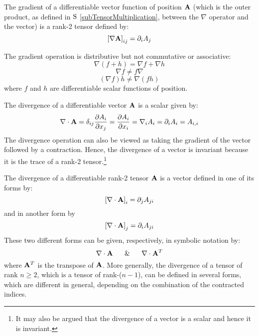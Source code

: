  The gradient of a differentiable vector function of position
$\vector{A}$ (which is the outer product, as defined in $\S$ 
\ref{subTensorMultiplication},
between the $\nabla$ operator and the vector) is a rank-2 tensor
defined by:
\begin{equation}
\left[\nabla\vector{A}\right]_{ij}=\partial_{i}A_{j}\label{eqGrad2}
\end{equation}


 The gradient operation is distributive but not commutative
or associative:
\begin{equation}
\nabla\left(f+h\right)=\nabla f+\nabla h
\end{equation}
\begin{equation}
\nabla f\ne f\nabla
\end{equation}
\begin{equation}
\left(\nabla f\right)h\ne\nabla\left(fh\right)
\end{equation}
where $f$ and $h$ are differentiable scalar functions of position.

 The divergence of a differentiable vector $\vector{A}$
is a scalar given by:
\begin{equation}
\nabla\cdot\vector{A}=\delta_{ij}\dfrac{\partial A_{i}}{\partial 
x_{j}}=\dfrac{\partial A_{i}}{\partial 
x_{i}}=\nabla_{i}A_{i}=\partial_{i}A_{i}=A_{i,i}\label{eqDiv}
\end{equation}
The divergence operation can also be viewed as taking the gradient
of the vector followed by a contraction. Hence, the divergence of
a vector is invariant because it is the trace of a rank-2 tensor.\footnote{It 
may also be argued that the divergence of a vector is a scalar
and hence it is invariant.}

 The divergence of a differentiable rank-2 tensor $\vector{A}$
is a vector defined in one of its forms by:
\begin{equation}
\left[\nabla\cdot\vector{A}\right]_{i}=\partial_{j}A_{ji}\label{eqDiv2}
\end{equation}
and in another form by
\begin{equation}
\left[\nabla\cdot\vector{A}\right]_{j}=\partial_{i}A_{ji}\label{eqDiv3}
\end{equation}
These two different forms can be given, respectively, in symbolic
notation by:
\begin{equation}
\nabla\cdot\vector{A}\,\,\,\,\,\,\,\,\,\,\&\,\,\,\,\,\,\,\,\,\,
\nabla\cdot\vector{A}^{T}
\end{equation}
where $\vector{A}^{T}$ is the transpose of $\vector{A}$. More generally,
the divergence of a tensor of rank $n\ge2$, which is a tensor of
rank-($n-1$), can be defined in several forms, which are different
in general, depending on the combination of the contracted indices.

